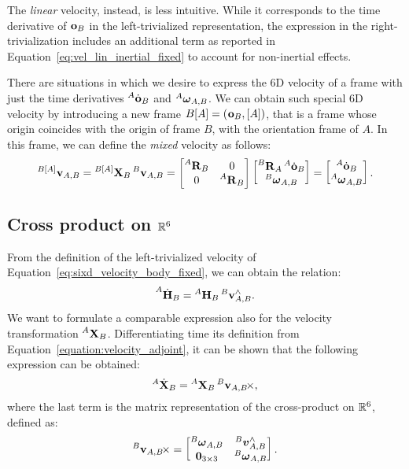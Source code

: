 The \emph{linear} velocity, instead, is less intuitive.
While it corresponds to the time derivative of $\ori_B$ in the left-trivialized representation, the expression in the right-trivialization includes an additional term as reported in Equation~\eqref{eq:vel_lin_inertial_fixed} to account for non-inertial effects.

There are situations in which we desire to express the 6D velocity of a frame with just the time derivatives $\orid[A]_B$ and $\velang[A]_{A,B}$.
We can obtain such special 6D velocity by introducing a new frame $B[A] = (\ori_B, [A])$, that is a frame whose origin coincides with the origin of frame $B$, with the orientation frame of $A$.
In this frame, we can define the \emph{mixed} velocity as follows:
%
\begin{equation}
    \label{eq:mixed_velocity}
    \velsix[{B[A]}]_{A,B} =
    \transvel[{B[A]}]_B \velsix[B]_{A,B} =
    \begin{bmatrix}
        \rot[A]_B & 0 \\ 0 & \rot[A]_B
    \end{bmatrix}
    \begin{bmatrix}
        \rot[B]_A \orid[A]_B \\ \velang[B]_{A,B}
    \end{bmatrix}
    =
    \begin{bmatrix}
        \orid[A]_B \\ \velang[A]_{A,B}
    \end{bmatrix}
    .
\end{equation}

\subsection{Cross product on $\realn^6$}

From the definition of the left-trivialized velocity of Equation~\eqref{eq:sixd_velocity_body_fixed}, we can obtain the relation:
%
\begin{equation*}
    \homod[A]_B = \homo[A]_B \velsix[B]_{A,B}^\wedge
    .
\end{equation*}
%
We want to formulate a comparable expression also for the velocity transformation $\transvel[A]_B$.
Differentiating \wrtl time its definition from Equation~\eqref{equation:velocity_adjoint}, it can be shown that the following expression can be obtained:
%
\begin{equation}
    \label{eq:X_dot}
    {}^A \dot{\mathbf{X}}_B = \transvel[A]_B \crossvelsix[{\velsix[B]_{A,B}}]
    ,
\end{equation}
%
where the last term is the matrix representation of the cross-product on $\realn^6$, defined as:
%
\begin{equation*}
    \crossvelsix[{\velsix[B]_{A,B}}] =
    \begin{bmatrix}
        \velang[B]_{A,B} & \vellin[B]_{A,B}^\wedge \\
        \zeros_{3\times 3} & \velang[B]_{A,B}
    \end{bmatrix}
    .
\end{equation*}

